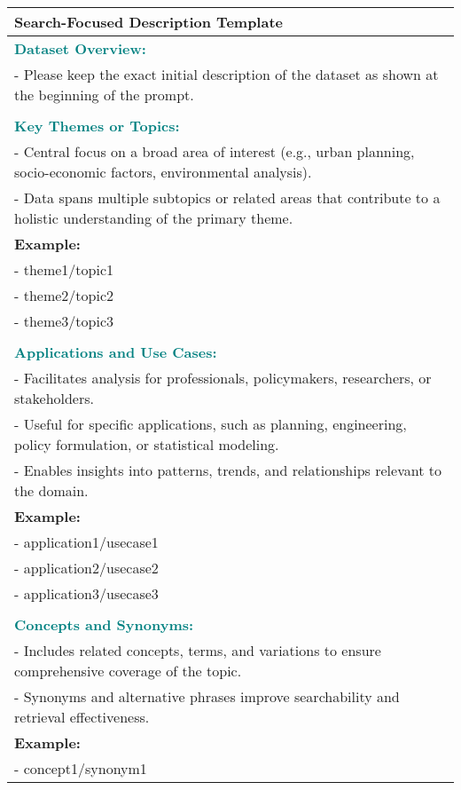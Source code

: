 \begin{table*}
    \small
    \centering
    \begin{tabular}{p{14cm}}
    \toprule
    \textbf{Search-Focused Description Template} \\
    \midrule
    \textcolor{teal}{\textbf{Dataset Overview:}} \\
    - Please keep the exact initial description of the dataset as shown at the beginning of the prompt. \\
    \\
    \textcolor{teal}{\textbf{Key Themes or Topics:}} \\
    - Central focus on a broad area of interest (e.g., urban planning, socio-economic factors, environmental analysis). \\
    - Data spans multiple subtopics or related areas that contribute to a holistic understanding of the primary theme. \\
    \textbf{Example:} \\
    - theme1/topic1 \\
    - theme2/topic2 \\
    - theme3/topic3 \\
    \\
    \textcolor{teal}{\textbf{Applications and Use Cases:}} \\
    - Facilitates analysis for professionals, policymakers, researchers, or stakeholders. \\
    - Useful for specific applications, such as planning, engineering, policy formulation, or statistical modeling. \\
    - Enables insights into patterns, trends, and relationships relevant to the domain. \\
    \textbf{Example:} \\
    - application1/usecase1 \\
    - application2/usecase2 \\
    - application3/usecase3 \\
    \\
    \textcolor{teal}{\textbf{Concepts and Synonyms:}} \\
    - Includes related concepts, terms, and variations to ensure comprehensive coverage of the topic. \\
    - Synonyms and alternative phrases improve searchability and retrieval effectiveness. \\
    \textbf{Example:} \\
    - concept1/synonym1 \\

\end{tabular}
\end{table*}
